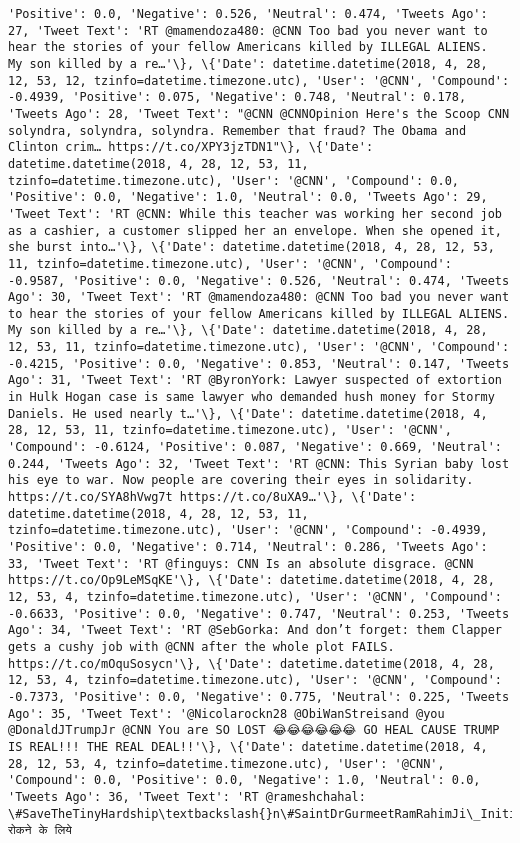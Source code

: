 \documentclass[11pt]{article}
\begin{document}
\begin{Verbatim}[commandchars=\\\{\}]
'Positive': 0.0, 'Negative': 0.526, 'Neutral': 0.474, 'Tweets Ago': 27, 'Tweet Text': 'RT @mamendoza480: @CNN Too bad you never want to hear the stories of your fellow Americans killed by ILLEGAL ALIENS.  My son killed by a re…'\}, \{'Date': datetime.datetime(2018, 4, 28, 12, 53, 12, tzinfo=datetime.timezone.utc), 'User': '@CNN', 'Compound': -0.4939, 'Positive': 0.075, 'Negative': 0.748, 'Neutral': 0.178, 'Tweets Ago': 28, 'Tweet Text': "@CNN @CNNOpinion Here's the Scoop CNN solyndra, solyndra, solyndra. Remember that fraud? The Obama and Clinton crim… https://t.co/XPY3jzTDN1"\}, \{'Date': datetime.datetime(2018, 4, 28, 12, 53, 11, tzinfo=datetime.timezone.utc), 'User': '@CNN', 'Compound': 0.0, 'Positive': 0.0, 'Negative': 1.0, 'Neutral': 0.0, 'Tweets Ago': 29, 'Tweet Text': 'RT @CNN: While this teacher was working her second job as a cashier, a customer slipped her an envelope. When she opened it, she burst into…'\}, \{'Date': datetime.datetime(2018, 4, 28, 12, 53, 11, tzinfo=datetime.timezone.utc), 'User': '@CNN', 'Compound': -0.9587, 'Positive': 0.0, 'Negative': 0.526, 'Neutral': 0.474, 'Tweets Ago': 30, 'Tweet Text': 'RT @mamendoza480: @CNN Too bad you never want to hear the stories of your fellow Americans killed by ILLEGAL ALIENS.  My son killed by a re…'\}, \{'Date': datetime.datetime(2018, 4, 28, 12, 53, 11, tzinfo=datetime.timezone.utc), 'User': '@CNN', 'Compound': -0.4215, 'Positive': 0.0, 'Negative': 0.853, 'Neutral': 0.147, 'Tweets Ago': 31, 'Tweet Text': 'RT @ByronYork: Lawyer suspected of extortion in Hulk Hogan case is same lawyer who demanded hush money for Stormy Daniels. He used nearly t…'\}, \{'Date': datetime.datetime(2018, 4, 28, 12, 53, 11, tzinfo=datetime.timezone.utc), 'User': '@CNN', 'Compound': -0.6124, 'Positive': 0.087, 'Negative': 0.669, 'Neutral': 0.244, 'Tweets Ago': 32, 'Tweet Text': 'RT @CNN: This Syrian baby lost his eye to war. Now people are covering their eyes in solidarity. https://t.co/SYA8hVwg7t https://t.co/8uXA9…'\}, \{'Date': datetime.datetime(2018, 4, 28, 12, 53, 11, tzinfo=datetime.timezone.utc), 'User': '@CNN', 'Compound': -0.4939, 'Positive': 0.0, 'Negative': 0.714, 'Neutral': 0.286, 'Tweets Ago': 33, 'Tweet Text': 'RT @finguys: CNN Is an absolute disgrace. @CNN https://t.co/Op9LeMSqKE'\}, \{'Date': datetime.datetime(2018, 4, 28, 12, 53, 4, tzinfo=datetime.timezone.utc), 'User': '@CNN', 'Compound': -0.6633, 'Positive': 0.0, 'Negative': 0.747, 'Neutral': 0.253, 'Tweets Ago': 34, 'Tweet Text': 'RT @SebGorka: And don’t forget: them Clapper gets a cushy job with @CNN after the whole plot FAILS. https://t.co/mOquSosycn'\}, \{'Date': datetime.datetime(2018, 4, 28, 12, 53, 4, tzinfo=datetime.timezone.utc), 'User': '@CNN', 'Compound': -0.7373, 'Positive': 0.0, 'Negative': 0.775, 'Neutral': 0.225, 'Tweets Ago': 35, 'Tweet Text': '@Nicolarockn28 @ObiWanStreisand @you @DonaldJTrumpJr @CNN You are SO LOST 😂😂😂😂😂😂 GO HEAL CAUSE TRUMP IS REAL!!! THE REAL DEAL!!'\}, \{'Date': datetime.datetime(2018, 4, 28, 12, 53, 4, tzinfo=datetime.timezone.utc), 'User': '@CNN', 'Compound': 0.0, 'Positive': 0.0, 'Negative': 1.0, 'Neutral': 0.0, 'Tweets Ago': 36, 'Tweet Text': 'RT @rameshchahal: \#SaveTheTinyHardship\textbackslash{}n\#SaintDrGurmeetRamRahimJi\_Initiative102\textbackslash{}nबालश्रम रोकने के लिये 
\end{Verbatim}
\end{document}
